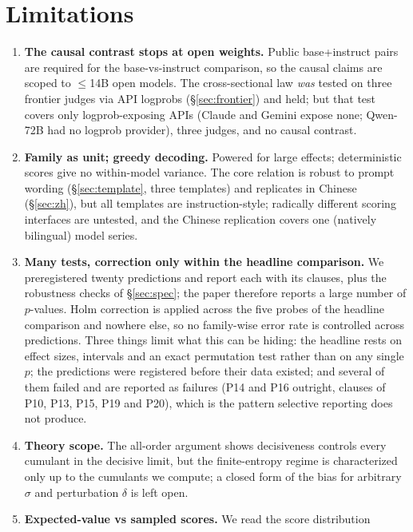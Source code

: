 \documentclass[11pt]{article}
\begin{document}
\section{Limitations}
\begin{enumerate}\itemsep2pt
  \item \textbf{The causal contrast stops at open weights.} Public base+instruct
        pairs are required for the base-vs-instruct comparison, so the causal claims
        are scoped to $\leq$14B open models. The cross-sectional law \emph{was}
        tested on three frontier judges via API logprobs (\S\ref{sec:frontier}) and
        held; but that test covers only logprob-exposing APIs (Claude and Gemini
        expose none; Qwen-72B had no logprob provider), three judges, and no causal
        contrast.
  \item \textbf{Family as unit; greedy decoding.} Powered for large effects; deterministic
        scores give no within-model variance. The core relation is robust to prompt
        wording (\S\ref{sec:template}, three templates) and replicates in Chinese
        (\S\ref{sec:zh}), but all templates are instruction-style; radically different
        scoring interfaces are untested, and the Chinese replication covers one
        (natively bilingual) model series.
  \item \textbf{Many tests, correction only within the headline comparison.} We
        preregistered twenty predictions and report each with its clauses, plus the
        robustness checks of \S\ref{sec:spec}; the paper therefore reports a large
        number of $p$-values. Holm correction is
        applied across the five probes of the headline comparison and nowhere else,
        so no family-wise error rate is controlled across predictions. Three things
        limit what this can be hiding: the headline rests on effect sizes, intervals
        and an exact permutation test rather than on any single $p$; the predictions
        were registered before their data existed; and several of them failed and are
        reported as failures (P14 and P16 outright, clauses of P10, P13, P15, P19 and P20),
        which is the pattern selective reporting does not produce.
  \item \textbf{Theory scope.} The all-order argument shows decisiveness controls every
        cumulant in the decisive limit, but the finite-entropy regime is characterized
        only up to the cumulants we compute; a closed form of the bias for arbitrary
        $\sigma$ and perturbation $\delta$ is left open.
  \item \textbf{Expected-value vs sampled scores.} We read the score distribution

\end{enumerate}
\end{document}

